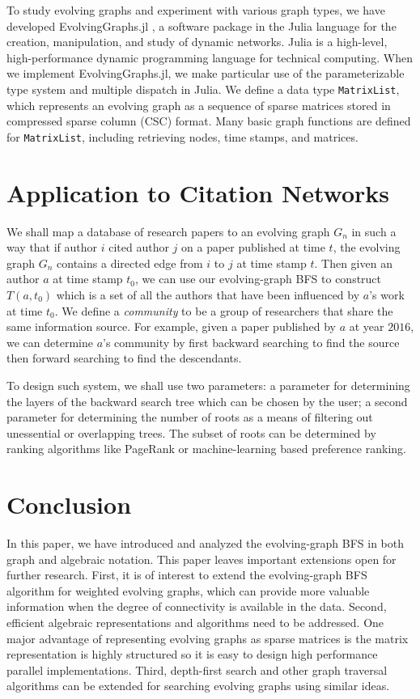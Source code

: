 \documentclass[11pt,conference,compsocconf]{IEEEtran}
\theoremstyle{definition}
\begin{document}
To study evolving graphs and experiment with various graph types, we have developed EvolvingGraphs.jl  \cite{zhang15}, a software package in the Julia language \cite{bkse12} for the creation, manipulation, and study of dynamic networks.
Julia is a high-level, high-performance dynamic programming language for technical
computing. When we implement EvolvingGraphs.jl, we make particular use of
the parameterizable type system and multiple dispatch in Julia.
We define a data type  \texttt{MatrixList}, which represents an evolving graph
as a sequence of sparse matrices stored in compressed sparse column (CSC) format.
Many basic graph functions are defined for \texttt{MatrixList}, including
retrieving nodes, time stamps, and matrices.

\section{Application to Citation Networks}
\label{sec:applications}

We shall map a database of research papers to an evolving graph $G_n$
in such a way that if author $i$ cited author $j$ on a paper published
at  time $t$, the evolving graph $G_n$ contains a directed edge from
$i$ to $j$ at time stamp $t$. Then given an author $a$ at time stamp $t_0$,
we can use our evolving-graph BFS to construct $T(a, t_0)$ which is
a set of all the authors that have been influenced by $a$'s work at
time $t_0$. We define a \emph{community} to be a group of
researchers that share the same information source.
For example, given a paper published by $a$ at year $2016$,
we can determine $a$'s community by first backward searching to
find the source then forward searching to find the descendants.

To design such system, we shall use two parameters:
 a parameter for
determining the layers of the backward search tree which can be chosen by the user;
a second parameter for determining the number of roots as a means of
filtering out unessential or overlapping trees. The subset of roots can be determined
by ranking algorithms like PageRank or machine-learning based preference ranking.


\section{Conclusion}

In this paper, we have introduced and analyzed the evolving-graph BFS in both
graph and algebraic notation.
This paper leaves important extensions open for further research. First, it is
of interest to extend the evolving-graph BFS algorithm for weighted evolving graphs, which can provide more valuable information when the degree of connectivity is available in the data.
Second, efficient algebraic representations and algorithms need to be addressed.
One major advantage of representing evolving graphs as sparse matrices
is the matrix representation is highly structured so it is easy to design
high performance parallel implementations.
Third, depth-first search and other graph traversal algorithms can be
extended for searching evolving graphs using similar ideas.
\end{document}
